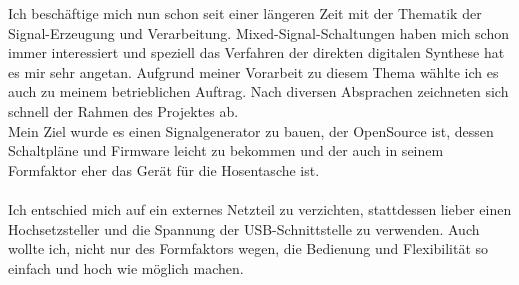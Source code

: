 Ich beschäftige mich nun schon seit einer längeren Zeit mit der Thematik der Signal-Erzeugung und Verarbeitung. Mixed-Signal-Schaltungen haben mich schon immer interessiert und speziell das Verfahren der direkten digitalen Synthese hat es mir sehr angetan. Aufgrund meiner Vorarbeit zu diesem Thema wählte ich es auch zu meinem betrieblichen Auftrag. Nach diversen Absprachen zeichneten sich schnell der Rahmen des Projektes ab.\\
Mein Ziel wurde es einen Signalgenerator zu bauen, der OpenSource ist, dessen Schaltpläne und Firmware leicht zu bekommen und der auch in seinem Formfaktor eher das Gerät für die Hosentasche ist.\\
\\
Ich entschied mich auf ein externes Netzteil zu verzichten, stattdessen lieber einen Hochsetzsteller und die Spannung der USB-Schnittstelle zu verwenden. Auch wollte ich, nicht nur des Formfaktors wegen, die Bedienung und Flexibilität so einfach und hoch wie möglich machen.